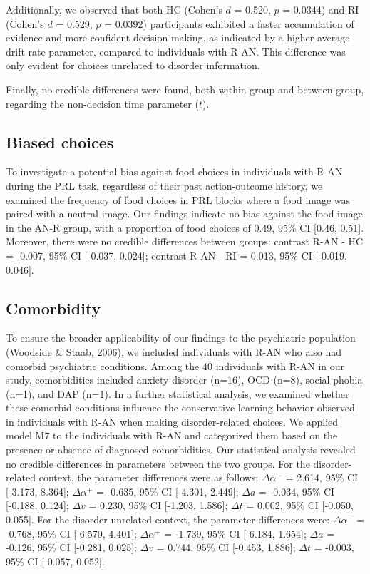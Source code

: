 \documentclass[
  man,floatsintext]{apa6}
\begin{document}
Additionally, we observed that both HC (Cohen's \(d\) = 0.520, \(p\) = 0.0344) and RI (Cohen's \(d\) = 0.529, \(p\) = 0.0392) participants exhibited a faster accumulation of evidence and more confident decision-making, as indicated by a higher average drift rate parameter, compared to individuals with R-AN. This difference was only evident for choices unrelated to disorder information.

Finally, no credible differences were found, both within-group and between-group, regarding the non-decision time parameter (\(t\)).

\hypertarget{biased-choices}{%
\subsection{Biased choices}\label{biased-choices}}

To investigate a potential bias against food choices in individuals with R-AN during the PRL task, regardless of their past action-outcome history, we examined the frequency of food choices in PRL blocks where a food image was paired with a neutral image. Our findings indicate no bias against the food image in the AN-R group, with a proportion of food choices of 0.49, 95\% CI {[}0.46, 0.51{]}. Moreover, there were no credible differences between groups: contrast R-AN - HC = -0.007, 95\% CI {[}-0.037, 0.024{]}; contrast R-AN - RI = 0.013, 95\% CI {[}-0.019, 0.046{]}.

\hypertarget{comorbidity}{%
\subsection{Comorbidity}\label{comorbidity}}

To ensure the broader applicability of our findings to the psychiatric population (Woodside \& Staab, 2006), we included individuals with R-AN who also had comorbid psychiatric conditions. Among the 40 individuals with R-AN in our study, comorbidities included anxiety disorder (n=16), OCD (n=8), social phobia (n=1), and DAP (n=1). In a further statistical analysis, we examined whether these comorbid conditions influence the conservative learning behavior observed in individuals with R-AN when making disorder-related choices. We applied model M7 to the individuals with R-AN and categorized them based on the presence or absence of diagnosed comorbidities. Our statistical analysis revealed no credible differences in parameters between the two groups. For the disorder-related context, the parameter differences were as follows: \(\Delta \alpha^-\) = 2.614, 95\% CI {[}-3.173, 8.364{]}; \(\Delta \alpha^+\) = -0.635, 95\% CI {[}-4.301, 2.449{]}; \(\Delta a\) = -0.034, 95\% CI {[}-0.188, 0.124{]}; \(\Delta v\) = 0.230, 95\% CI {[}-1.203, 1.586{]}; \(\Delta t\) = 0.002, 95\% CI {[}-0.050, 0.055{]}. For the disorder-unrelated context, the parameter differences were: \(\Delta \alpha^-\) = -0.768, 95\% CI {[}-6.570, 4.401{]}; \(\Delta \alpha^+\) = -1.739, 95\% CI {[}-6.184, 1.654{]}; \(\Delta a\) = -0.126, 95\% CI {[}-0.281, 0.025{]}; \(\Delta v\) = 0.744, 95\% CI {[}-0.453, 1.886{]}; \(\Delta t\) = -0.003, 95\% CI {[}-0.057, 0.052{]}.
\end{document}

